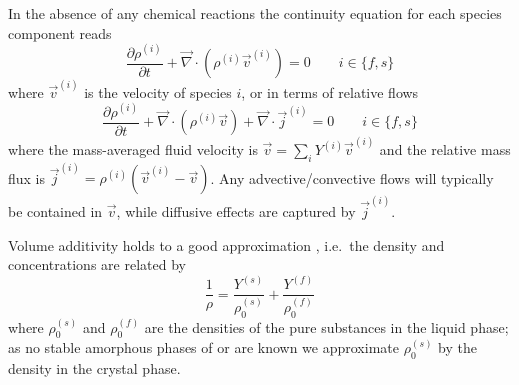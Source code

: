 \documentclass[11pt,twoside]{report}
\begin{document}
In the absence of any chemical reactions the continuity equation for each species component reads
\begin{equation}\label{eq:species-continuity}
  \frac{\partial \rho^{(i)}}{\partial t} +
  \vec{\nabla} \cdot (\rho^{(i)} \vec{v}^{(i)}) = 0
  \qquad i \in \{f,s\}
\end{equation}
where $\vec{v}^{(i)}$ is the velocity of species $i$, or in terms of relative flows
\begin{equation}\label{eq:species-continuity-relative}
  \frac{\partial \rho^{(i)}}{\partial t} +
  \vec{\nabla} \cdot (\rho^{(i)} \vec{v}) +
  \vec{\nabla} \cdot \vec{j}^{(i)} = 0
  \qquad i \in \{f,s\}
\end{equation}
where the mass-averaged fluid velocity is $\vec{v} = \sum_i Y^{(i)} \vec{v}^{(i)}$ and the relative mass flux is $\vec{j}^{(i)} = \rho^{(i)} (\vec{v}^{(i)} - \vec{v})$.
Any advective/convective flows will typically be contained in $\vec{v}$, while diffusive effects are captured by $\vec{j}^{(i)}$.

Volume additivity holds to a good approximation \cite{HandscombCES2009}, i.e.\ the density and concentrations are related by
\begin{equation}\label{eq:volume-additivity}
  \frac{1}{\rho} =
  \frac{Y^{(s)}}{\rho_0^{(s)}} + \frac{Y^{(f)}}{\rho_0^{(f)}}
\end{equation}
where $\rho_0^{(s)}$ and $\rho_0^{(f)}$ are the densities of the pure substances in the liquid phase; as no stable amorphous phases of  or  are known we approximate $\rho_0^{(s)}$ by the density in the crystal phase.
\end{document}
